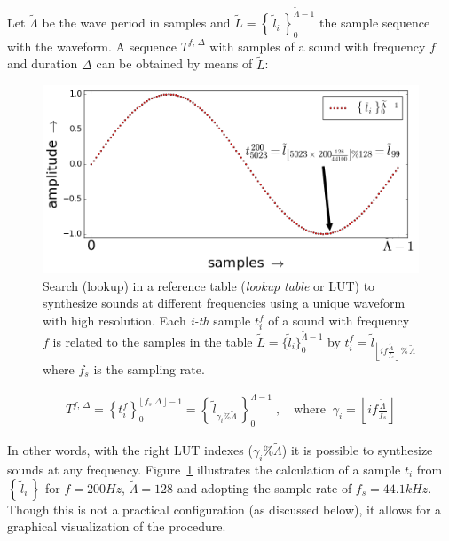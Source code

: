 Let $\widetilde{\Lambda}$ be the wave period in samples and $\widetilde{L} = \left\{\, \widetilde{l}_i \,\right\}_0^{\widetilde{\Lambda} -1}$ the sample sequence with the waveform.
A sequence $T^{f,\,\Delta}$ with samples of a sound with frequency $f$ and duration $\Delta$ can be obtained by means of $\widetilde{L}$:

\begin{figure}[t!]
    \centering
        \includegraphics[width=.7\textwidth]{figures/lut_}
	\caption{Search (lookup) in a reference table (\emph{lookup table} or LUT) to synthesize sounds at different frequencies using a unique waveform with high resolution.
	Each \emph{i-th} sample $t_i^f$ of a sound with frequency $f$ is related to the samples in the table $\widetilde{L}=\{\widetilde{l}_i\}_0^{\widetilde{\Lambda}-1}$ by $t_i^{f}=\widetilde{l}_{\left\lfloor i f\frac{\widetilde{\Lambda}}{f_s} \right\rfloor \%\,\widetilde{\Lambda}}$ where $f_s$ is the sampling rate.}
        \label{fig:lut}
\end{figure}

\begin{equation}\label{eq:lut}
\begin{split}
T^{f,\,\Delta}=\left\{t_i^f\right\}_0^{\lfloor \, f_s . \Delta \, \rfloor -1} = \left\{ \, \widetilde{l}_{\gamma_i \% \widetilde{\Lambda} }\, \right\}_{0}^{\Lambda-1}\; , \quad \text{where} \;\; \gamma_i = \left \lfloor i f \frac{ \widetilde{\Lambda}}{f_s} \right \rfloor  
\end{split}
\end{equation}

In other words, with the right LUT indexes ($\gamma_i\%\widetilde{\Lambda}$) it is possible to synthesize sounds at any frequency.
Figure~\ref{fig:lut} illustrates the calculation of a sample $t_i$ from $\left\{\,\widetilde{l}_i\,\right\}$ for $f=200Hz$, $\widetilde{\Lambda}=128$ and adopting the sample rate of $f_s=44.1kHz$. Though this is not a practical configuration (as discussed below), it allows for a graphical visualization of the procedure.

